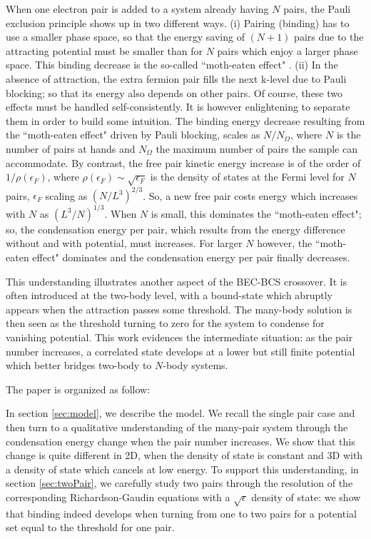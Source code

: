 \documentclass[5p,twocolumn]{elsarticle}
\begin{document}
When one electron pair is added to a system already having $N$ pairs, the Pauli exclusion principle shows up in two different ways.  (i) Pairing (binding) has to use a smaller phase space, so that the energy saving of $(N+1)$ pairs due to the attracting potential must be smaller than for $N$ pairs which enjoy a larger phase space.  This binding decrease is the so-called ``moth-eaten effect" \cite{moth}. (ii) In the absence of attraction, the extra fermion pair fills the next k-level due to Pauli blocking; so that its energy also depends on other pairs.  Of course, these two effects must be handled self-consistently. It is however enlightening to separate them in order to build some intuition. The binding energy decrease resulting from the ``moth-eaten effect" driven by Pauli blocking, scales as $N/N_\Omega$, where $N$ is the number of pairs at hands and $N_\Omega$ the maximum number of pairs the sample can accommodate. By contrast, the free pair kinetic energy increase is of the order of $1/\rho(\epsilon_F)$, where $\rho(\epsilon_F)\sim\sqrt{\epsilon_F}$ is the density of states at the Fermi level for $N$ pairs, $\epsilon_F$ scaling as $(N/L^3)^{2/3}$. So, a new free pair costs  energy which increases with $N$ as $(L^3/N)^{1/3}$. When $N$ is small, this dominates the ``moth-eaten effect"; so, the condensation energy per pair, which results from the energy difference without and with potential, must increases.  For larger $N$ however, the ``moth-eaten effect" dominates and the condensation energy per pair finally decreases.

This understanding illustrates another aspect of the BEC-BCS crossover.  It is often introduced at the two-body level, with a bound-state which abruptly appears when the attraction passes some threshold. The many-body solution is then seen as the threshold turning to zero for the system to condense for vanishing potential. This work evidences the intermediate situation: as the pair number increases, a correlated state develops at a lower but still finite potential which better bridges two-body to $N$-body systems. 

The paper is organized as follow:

In section \ref{sec:model}, we describe the model. We recall the single pair case and then turn to a qualitative understanding of the many-pair system through the condensation energy change when the pair number increases. We show that this change is quite different in 2D, when the density of state is constant and 3D  with a density of state which cancels at low energy.  To support this understanding, in section \ref{sec:twoPair}, we carefully study two pairs through the resolution of the corresponding  Richardson-Gaudin equations with a $\sqrt{\epsilon}$ density of state: we show that  binding indeed develops when turning from one to two pairs for a potential set equal to the threshold for one pair.
\end{document}
